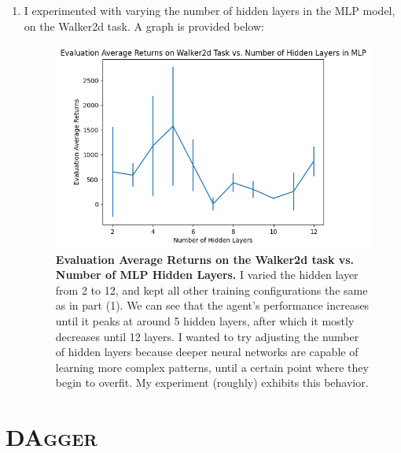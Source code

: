 \documentclass[12pt]{article}
\begin{document}
\begin{enumerate}
  \item I experimented with varying the number of hidden layers in the MLP model, on the Walker2d task. A graph is provided below:
  \begin{figure}[h!]
    \begin{center}
    \includegraphics[width=\textwidth*2/3]{walker2d_hidden.png}
    \caption{\textbf{Evaluation Average Returns on the Walker2d task vs. Number of MLP Hidden Layers.} I varied the hidden layer from 2 to 12, and kept all other training configurations the same as in part (1). We can see that the agent's performance increases until it peaks at around 5 hidden layers, after which it mostly decreases until 12 layers. I wanted to try adjusting the number of hidden layers because deeper neural networks are capable of learning more complex patterns, until a certain point where they begin to overfit. My experiment (roughly) exhibits this behavior.}
  \end{center}
  \end{figure}
\end{enumerate}

\section{\textsc{DAgger}}
\end{document}

